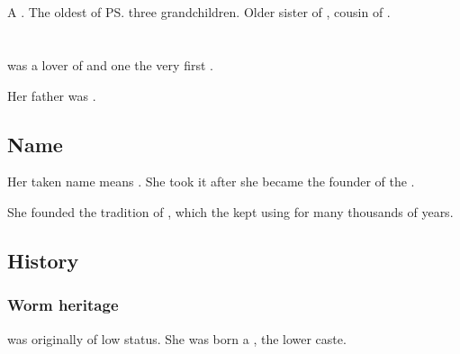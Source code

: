 \section{\Thiencaste}
\index{\Thiencaste}
A \dragon. 
The oldest of \ps{\QuessanthIshnaruchaefir} three grandchildren. 
Older sister of \Tentocoth, cousin of \Rathyon. 















\section[Dzairith Tyrasshana]{\TyarithXserasshana}
\index{\TyarithXserasshana}
\TyarithXserasshana{} was a lover of \Sethicus and one the very first \dragons. 

Her father was . 







\subsection{Name}
Her taken name \quo{\Kserasshana} means . 
She took it after she became the founder of the \dzraicchenosses. 

She founded the tradition of , which the \dragons{} kept using for many thousands of years. 






\subsection{History}





\subsubsection{Worm heritage}
\Tiamat was originally of low status. 
She was born a , the \Caisith lower caste.





